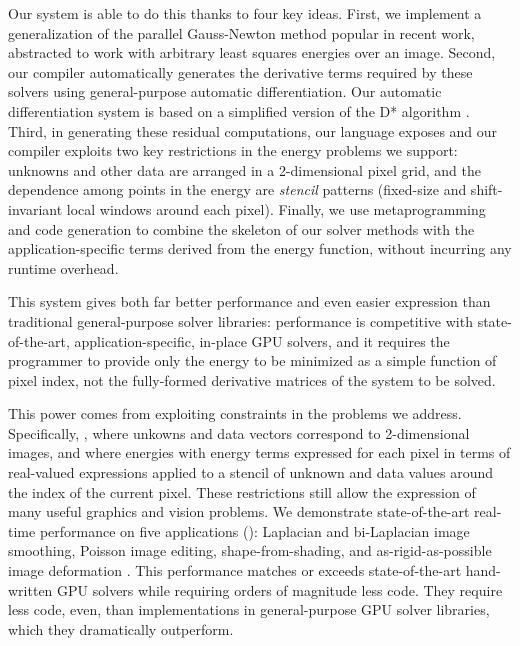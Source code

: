 Our system is able to do this thanks to four key ideas.
First, we implement a generalization of the parallel Gauss-Newton method popular in recent work, abstracted to work with arbitrary least squares energies over an image.
Second, our compiler automatically generates the derivative terms required by these solvers using general-purpose automatic  differentiation.
Our automatic differentiation system is based on a simplified version of the D* algorithm \cite{dstar}.
Third, in generating these residual computations, our language exposes and our compiler exploits two key restrictions in the energy problems we support: unknowns and other data are arranged in a 2-dimensional pixel grid, and the dependence among points in the energy are \emph{stencil} patterns (fixed-size and shift-invariant local windows around each pixel).
Finally, we use metaprogramming and code generation to combine the skeleton of our solver methods with the application-specific terms derived from the energy function, without incurring any runtime overhead.

This system gives both far better performance and even easier expression than traditional general-purpose solver libraries: performance is competitive with state-of-the-art, application-specific, in-place GPU solvers, and it requires the programmer to provide only the energy to be minimized as a simple function of pixel index, not the fully-formed derivative matrices of the system to be solved.

\FigAppSummary

This power comes from exploiting constraints in the problems we address.
Specifically, , where unkowns and data vectors correspond to 2-dimensional images, and where energies  with energy terms expressed for each pixel in terms of real-valued expressions applied to a stencil of unknown and data values around the index of the current pixel.
These restrictions still allow the expression of many useful graphics and vision problems.
We demonstrate state-of-the-art real-time performance on five applications (): Laplacian and bi-Laplacian image smoothing, Poisson image editing, shape-from-shading, and as-rigid-as-possible image deformation .
This performance matches or exceeds state-of-the-art hand-written GPU solvers while requiring orders of magnitude less code.
They require less code, even, than implementations in general-purpose GPU solver libraries, which they dramatically outperform.